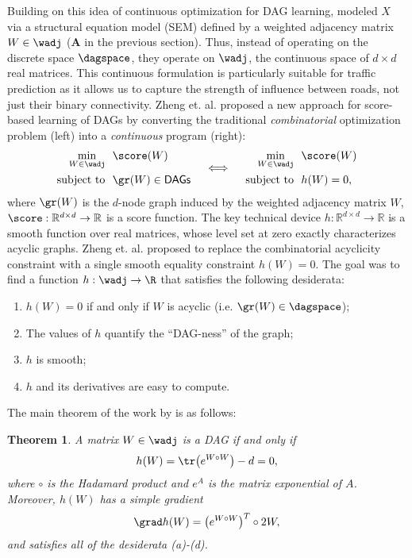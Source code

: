 \documentclass[pdflatex,sn-mathphys-num]{sn-jnl}%
\theoremstyle{thmstyleone}%
\newtheorem{theorem}{Theorem}%
\theoremstyle{thmstyletwo}%
\theoremstyle{thmstylethree}%
\begin{document}
Building on this idea of continuous optimization for DAG learning,
\cite{zheng2018dags} modeled $X$ via a structural equation model (SEM) defined by a weighted adjacency matrix $W\in\wadj$ ($\textbf{A}$ in the previous section). Thus, instead of operating on the discrete space $\dagspace$, they operate on $\wadj$, the continuous space of $d\times d$ real matrices. This continuous formulation is particularly suitable for traffic prediction as it allows us to capture the strength of influence between roads, not just their binary connectivity.
Zheng et. al. proposed a new approach for score-based learning of DAGs by converting the traditional \emph{combinatorial} optimization problem (left) into a \emph{continuous} program (right):
\begin{align}
\label{eq:main:idea}
\begin{aligned}
\min_{W\in\wadj} & \ \ \score(W) \\
\text{subject to} & \ \ \gr(W) \in \mathsf{DAGs}
\end{aligned}
\quad \iff \quad 
\begin{aligned}
\min_{W\in\wadj} & \ \ \score(W) \\
\text{subject to} & \ \ h(W) = 0,
\end{aligned}
\end{align}
\noindent
where $\gr(W)$ is the $d$-node graph induced by the weighted adjacency matrix $W$,
$\score: \mathbb{R}^{d \times d} \to \mathbb{R} $ is a {score function}.
The key technical device $h: \mathbb{R}^{d \times d} \to \mathbb{R} $ is a smooth function over real matrices, whose level set at zero exactly characterizes acyclic graphs.
Zheng et. al. proposed to replace the combinatorial acyclicity constraint with a single smooth equality constraint $h(W)=0$. The goal was to find a function $h: \wadj \to \R$ that satisfies the following desiderata: 
\begin{enumerate}[label=(\alph*), itemsep=0pt]
\item $h(W)=0$ if and only if $W$ is acyclic (i.e. $\gr(W)\in\dagspace$);
\item The values of $h$ quantify the ``DAG-ness'' of the graph;
\item $h$ is smooth;
\item $h$ and its derivatives are easy to compute.
\end{enumerate}

The main theorem of the work by \cite{zheng2018dags} is as follows:

\begin{theorem}
\label{thm:ideal}
A matrix $W\in\wadj$ is a DAG if and only if 
\begin{align}
\label{eq:def:h}
h(W) = \tr \big( e^{W \circ W} \big) - d = 0,
\end{align}
where $ \circ $ is the Hadamard product and $ e^A $ is the matrix exponential of $ A $. Moreover, $ h(W) $ has a simple gradient 
\begin{align}
\label{eq:def:gradh}
\grad h(W) = \big( e^{W \circ W} \big)^T \circ 2W,
\end{align}
and satisfies all of the desiderata (a)-(d).
\end{theorem}
\end{document}
